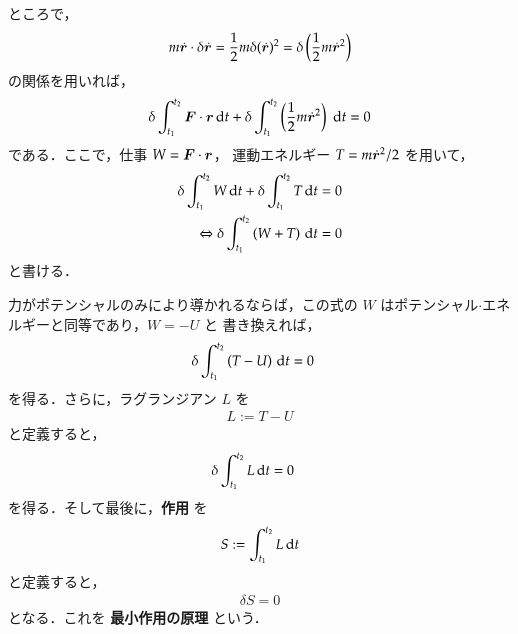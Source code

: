             ところで，
                \begin{align}
                    m\dot{\boldsymbol{r}}\cdot\delta \dot{\boldsymbol{r}} =
                    \frac{1}{2}m\delta(\dot{\boldsymbol{r}})^{2}=
                    \delta\left(\frac{1}{2}m\dot{\boldsymbol{r}}^{2}\right)
                \end{align}
            の関係を用いれば，
                \begin{align}
                        \delta\int_{t_{1}}^{t_{2}}\boldsymbol{F}\cdot\boldsymbol{r}\,\mathrm{d} t+
                        \delta\int_{t_{1}}^{t_{2}}
                        \left(\frac{1}{2}m\dot{\boldsymbol{r}}^{2}\right)\, \,\mathrm{d} t = 0
                \end{align}
            である．ここで，仕事 $W=\boldsymbol{F}\cdot\boldsymbol{r}$，
            運動エネルギー $T=m\dot{\boldsymbol{r}}^{2}/2$ を用いて，
                \begin{align}
                        \delta\int_{t_{1}}^{t_{2}}W\,\mathrm{d} t+
                        \delta\int_{t_{1}}^{t_{2}}T\,\mathrm{d} t &= 0 \notag \\
                        \Leftrightarrow
                        \delta\int_{t_{1}}^{t_{2}}\left(W+T\right) \,\mathrm{d} t &= 0
                \end{align}
            と書ける．

            力がポテンシャルのみにより導かれるならば，この式の $W$ はポテンシャル$\cdot$エネルギーと同等であり，$W=-U$ と
            書き換えれば，
                \begin{align}
                        \delta\int_{t_{1}}^{t_{2}}\left(T-U\right) \,\mathrm{d} t &= 0
                \end{align}
            を得る．さらに，ラグランジアン $L$ を
                \begin{align}
                    L := T-U
                \end{align}
            と定義すると，
                \begin{align}
                        \delta\int_{t_{1}}^{t_{2}}L  \,\mathrm{d} t &= 0
                \end{align}
            を得る．そして最後に，\textbf{作用} を
                \begin{align}
                        S := \int_{t_{1}}^{t_{2}}L \,\mathrm{d} t
                \end{align}
            と定義すると，
                \begin{align}
                    \delta S = 0
                \end{align}
            となる．これを \textbf{最小作用の原理} という．

